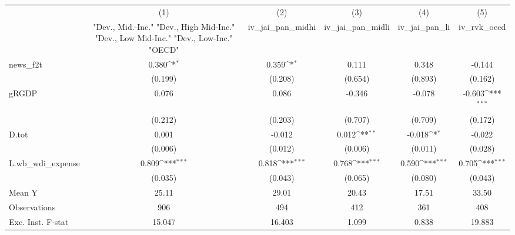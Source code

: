 {
\def\sym#1{\ifmmode^{#1}\else\(^{#1}\)\fi}
\begin{tabular}{l*{5}{c}}
\toprule
            &\multicolumn{1}{c}{(1)}&\multicolumn{1}{c}{(2)}&\multicolumn{1}{c}{(3)}&\multicolumn{1}{c}{(4)}&\multicolumn{1}{c}{(5)}\\
            &\multicolumn{1}{c}{ "Dev., Mid.-Inc." "Dev., High Mid-Inc." "Dev., Low Mid-Inc." "Dev., Low-Inc." "OECD" }&\multicolumn{1}{c}{iv\_jai\_pan\_midhi}&\multicolumn{1}{c}{iv\_jai\_pan\_midli}&\multicolumn{1}{c}{iv\_jai\_pan\_li}&\multicolumn{1}{c}{iv\_rvk\_oecd}\\
\midrule
news\_f2t    &       0.380\sym{*}  &       0.359\sym{*}  &       0.111         &       0.348         &      -0.144         \\
            &     (0.199)         &     (0.208)         &     (0.654)         &     (0.893)         &     (0.162)         \\
\addlinespace
gRGDP       &       0.076         &       0.086         &      -0.346         &      -0.078         &      -0.603\sym{***}\\
            &     (0.212)         &     (0.203)         &     (0.707)         &     (0.709)         &     (0.172)         \\
\addlinespace
D.tot       &       0.001         &      -0.012         &       0.012\sym{**} &      -0.018\sym{*}  &      -0.022         \\
            &     (0.006)         &     (0.012)         &     (0.006)         &     (0.011)         &     (0.028)         \\
\addlinespace
L.wb\_wdi\_expense&       0.809\sym{***}&       0.818\sym{***}&       0.768\sym{***}&       0.590\sym{***}&       0.705\sym{***}\\
            &     (0.035)         &     (0.043)         &     (0.065)         &     (0.080)         &     (0.043)         \\
\midrule
Mean Y      &       25.11         &       29.01         &       20.43         &       17.51         &       33.50         \\
Observations&         906         &         494         &         412         &         361         &         408         \\
Exc. Inst. F-stat&      15.047         &      16.403         &       1.099         &       0.838         &      19.883         \\
\bottomrule
\end{tabular}
}
